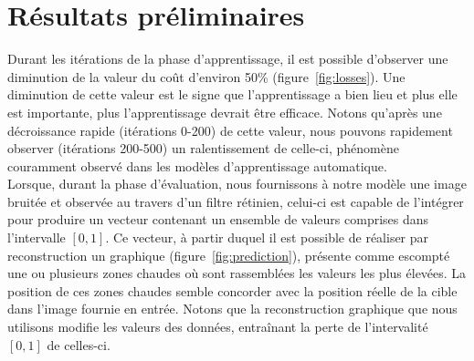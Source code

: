 \section{Résultats préliminaires}

Durant les itérations de la phase d'apprentissage, il est possible d'observer une diminution de la valeur du coût d'environ 50\% (figure~\ref{fig:losses}). 
Une diminution de cette valeur est le signe que l'apprentissage a bien lieu et plus elle est importante, plus l'apprentissage devrait être efficace.
Notons qu'après une décroissance rapide (itérations 0-200) de cette valeur, nous pouvons rapidement observer (itérations 200-500) un ralentissement de celle-ci, phénomène couramment observé dans les modèles d'apprentissage automatique. \\
Lorsque, durant la phase d'évaluation, nous fournissons à notre modèle une image bruitée et observée au travers d'un filtre rétinien, celui-ci est capable de l'intégrer pour produire un vecteur contenant un ensemble de valeurs comprises dans l'intervalle $[0,1]$.
Ce vecteur, à partir duquel il est possible de réaliser par reconstruction un graphique (figure~\ref{fig:prediction}), présente comme escompté une ou plusieurs zones chaudes où sont rassemblées les valeurs les plus élevées. 
La position de ces zones chaudes semble concorder avec la position réelle de la cible dans l'image fournie en entrée.
Notons que la reconstruction graphique que nous utilisons modifie les valeurs des données, entraînant la perte de l'intervalité $[0,1]$ de celles-ci. \\